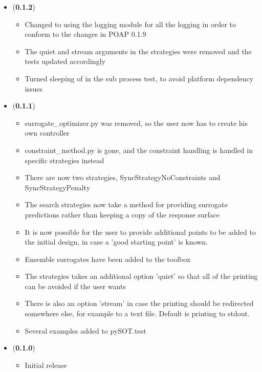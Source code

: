 \documentclass[]{article}
\begin{document}
\begin{itemize}
	\item (\textbf{0.1.2})
	\begin{itemize}
		\item 	Changed to using the logging module for all the logging in order to conform to the 
		changes in POAP 0.1.9
		\item The quiet and stream arguments in the strategies were removed and the tests 
		updated accordingly
		\item Turned sleeping of in the sub process test, to avoid platform dependency issues
	\end{itemize}

	\item (\textbf{0.1.1})
	\begin{itemize}
		\item surrogate\_optimizer.py was removed, so the user now has to create his own controller
		\item constraint\_method.py is gone, and the constraint handling is handled in specific 
		strategies instead
		\item 	There are now two strategies, SyncStrategyNoConstraints and SyncStrategyPenalty
		\item The search strategies now take a method for providing surrogate predictions rather 
		than keeping a copy of the response surface
		\item It is now possible for the user to provide additional points to be added to the initial 
		design, in case a 'good starting point' is known.
		\item Ensemble surrogates have been added to the toolbox
		\item 	The strategies takes an additional option 'quiet' so that all of the printing can be 
		avoided if the user wants
		\item There is also an option 'stream' in case the printing should be redirected somewhere 
		else, for example to a text file. Default is printing to stdout.
		\item 	Several examples added to pySOT.test
	\end{itemize}
	
	\item (\textbf{0.1.0})
	\begin{itemize}
		\item 	Initial release
	\end{itemize}
\end{itemize}
\end{document}
